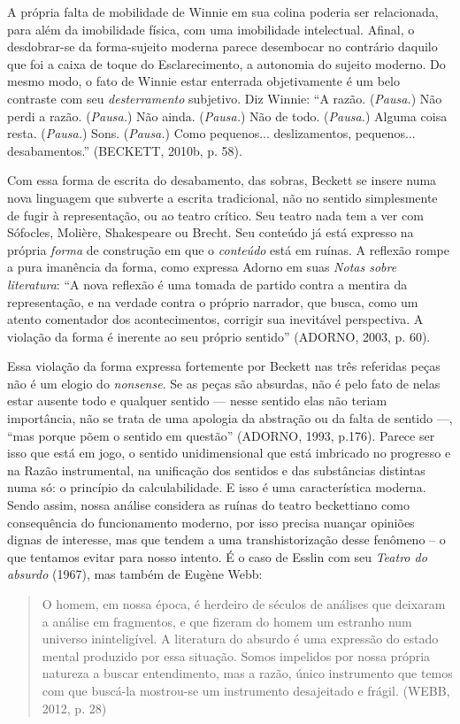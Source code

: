 A própria falta de mobilidade de Winnie em sua colina poderia ser
relacionada, para além da imobilidade física, com uma imobilidade
intelectual. Afinal, o desdobrar-se da forma-sujeito moderna parece
desembocar no contrário daquilo que foi a caixa de toque do
Esclarecimento, a autonomia do sujeito moderno. Do mesmo modo, o fato de
Winnie estar enterrada objetivamente é um belo contraste com seu
\emph{desterramento} subjetivo. Diz Winnie: ``A razão. (\emph{Pausa.})
Não perdi a razão. (\emph{Pausa.}) Não ainda. (\emph{Pausa.}) Não de
todo. (\emph{Pausa.}) Alguma coisa resta. (\emph{Pausa.}) Sons.
(\emph{Pausa.}) Como pequenos... deslizamentos, pequenos...
desabamentos.'' (BECKETT, 2010b, p. 58).

Com essa forma de escrita do desabamento, das sobras, Beckett se insere
numa nova linguagem que subverte a escrita tradicional, não no sentido
simplesmente de fugir à representação, ou ao teatro crítico. Seu teatro
nada tem a ver com Sófocles, Molière, Shakespeare ou Brecht. Seu
conteúdo já está expresso na própria \emph{forma} de construção em que o
\emph{conteúdo} está em ruínas. A reflexão rompe a pura imanência da
forma, como expressa Adorno em suas \emph{Notas sobre literatura}: ``A
nova reflexão é uma tomada de partido contra a mentira da representação,
e na verdade contra o próprio narrador, que busca, como um atento
comentador dos acontecimentos, corrigir sua inevitável perspectiva. A
violação da forma é inerente ao seu próprio sentido'' (ADORNO, 2003, p.
60).

Essa violação da forma expressa fortemente por Beckett nas três
referidas peças não é um elogio do \emph{nonsense}. Se as peças são
absurdas, não é pelo fato de nelas estar ausente todo e qualquer sentido
--- nesse sentido elas não teriam importância, não se trata de uma
apologia da abstração ou da falta de sentido ---, ``mas porque põem o
sentido em questão'' (ADORNO, 1993, p.176). Parece ser isso que está em
jogo, o sentido unidimensional que está imbricado no progresso e na
Razão instrumental, na unificação dos sentidos e das substâncias
distintas numa só: o princípio da calculabilidade. E isso é uma
característica moderna. Sendo assim, nossa análise considera as ruínas
do teatro beckettiano como consequência do funcionamento moderno, por
isso precisa nuançar opiniões dignas de interesse, mas que tendem a uma
transhistorização desse fenômeno -- o que tentamos evitar para nosso
intento. É o caso de Esslin com seu \emph{Teatro do absurdo} (1967), mas
também de Eugène Webb:

\begin{quote}
O homem, em nossa época, é herdeiro de séculos de análises que deixaram
a análise em fragmentos, e que fizeram do homem um estranho num universo
ininteligível. A literatura do absurdo é uma expressão do estado mental
produzido por essa situação. Somos impelidos por nossa própria natureza
a buscar entendimento, mas a razão, único instrumento que temos com que
buscá-la mostrou-se um instrumento desajeitado e frágil. (WEBB, 2012, p.
28)
\end{quote}

